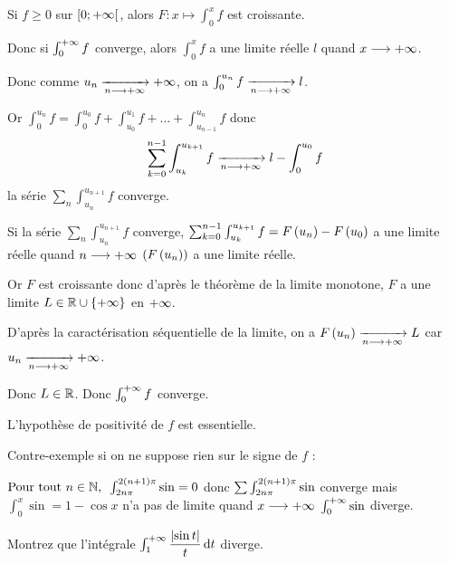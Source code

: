 \begin{dem}
\impdir

Si \(f\geq0\) sur \(\left[0;+\infty\right[\), alors \(F:x\mapsto\int_0^xf\) est croissante.

Donc si \(\int_0^{+\infty}f\) converge, alors \(\int_0^xf\) a une limite réelle \(l\) quand \(x\longrightarrow+\infty\).

Donc comme \(u_n\xrightarrow[n\longrightarrow+\infty]{}+\infty\), on a \(\int_0^{u_n}f\xrightarrow[n\longrightarrow+\infty]{}l\).

Or \(\int_0^{u_n}f=\int_0^{u_0}f+\int_{u_0}^{u_1}f+\dots+\int_{u_{n-1}}^{u_n}f\) donc \[\sum_{k=0}^{n-1}\int_{u_k}^{u_{k+1}}f\xrightarrow[n\longrightarrow+\infty]{}l-\int_0^{u_0}f\] \ie la série \(\sum_n\int_{u_n}^{u_{n+1}}f\) converge.

\imprec

Si la série \(\sum_n\int_{u_n}^{u_{n+1}}f\) converge, \(\sum_{k=0}^{n-1}\int_{u_k}^{u_{k+1}}f=F\left(u_n\right)-F\left(u_0\right)\) a une limite réelle quand \(n\longrightarrow+\infty\) \ie \(\left(F\left(u_n\right)\right)\) a une limite réelle.

Or \(F\) est croissante donc d'après le théorème de la limite monotone, \(F\) a une limite \(L\in\mathbb{R}\cup\left\lbrace+\infty\right\rbrace\) en \(+\infty\).

D'après la caractérisation séquentielle de la limite, on a \(F\left(u_n\right)\xrightarrow[n\longrightarrow+\infty]{}L\) car \(u_n\xrightarrow[n\longrightarrow+\infty]{}+\infty\).

Donc \(L\in\mathbb{R}\). Donc \(\int_0^{+\infty}f\) converge.
\end{dem}

\begin{rem}
L'hypothèse de positivité de \(f\) est essentielle.

Contre-exemple si on ne suppose rien sur le signe de \(f\) :

\(\quantifs{\Tpt n\in\N}\int_{2n\pi}^{2\paren{n+1}\pi}\sin=0\) donc \(\sum\int_{2n\pi}^{2\left(n+1\right)\pi}\sin\) converge mais \(\int_0^x\sin=1-\cos x\) n'a pas de limite quand \(x\longrightarrow+\infty\) \ie \(\int_0^{+\infty}\sin\) diverge.
\end{rem}

\begin{exo}
Montrez que l'intégrale \(\int_1^{\pinf}\dfrac{\abs{\sin t}}{t}\odif{t}\) diverge.
\end{exo}

